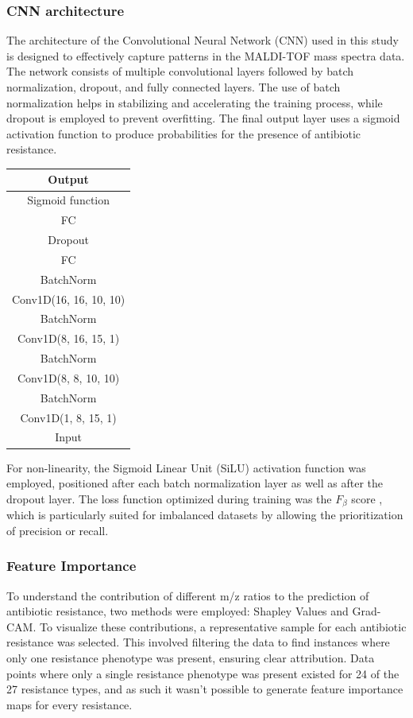 \documentclass[english,11pt,a4paper,titlepage]{article}
\begin{document}
	\subsubsection*{CNN architecture}
	\begin{multicols}{2}
		\noindent
		The architecture of the Convolutional Neural Network (CNN) used in this study is designed to effectively capture patterns in the MALDI-TOF mass spectra data. The network consists of multiple convolutional layers followed by batch normalization, dropout, and fully connected layers. The use of batch normalization helps in stabilizing and accelerating the training process, while dropout is employed to prevent overfitting. The final output layer uses a sigmoid activation function to produce probabilities for the presence of antibiotic resistance.
		
		\columnbreak
		
		\begin{tabular}{|c|}
			\hline
			Output \\
			\hline
			Sigmoid function \\
			\hline
			FC \\
			\hline
			Dropout \\
			\hline
			FC \\
			\hline
			BatchNorm \\
			\hline
			Conv1D(16, 16, 10, 10) \\
			\hline
			BatchNorm \\
			\hline
			Conv1D(8, 16, 15, 1) \\
			\hline
			BatchNorm \\
			\hline
			Conv1D(8, 8, 10, 10) \\
			\hline
			BatchNorm \\
			\hline
			Conv1D(1, 8, 15, 1) \\
			\hline
			Input \\
			\hline
		\end{tabular}
		
	\end{multicols}
	For non-linearity, the Sigmoid Linear Unit (SiLU) activation function was employed, positioned after each batch normalization layer as well as after the dropout layer. The loss function optimized during training was the \( F_{\beta} \) score \cite{leeSurrogateLossFunction2021}, which is particularly suited for imbalanced datasets by allowing the prioritization of precision or recall.
	
	\subsubsection*{Feature Importance}
	To understand the contribution of different m/z ratios to the prediction of antibiotic resistance, two methods were employed: Shapley Values and Grad-CAM. To visualize these contributions, a representative sample for each antibiotic resistance was selected. This involved filtering the data to find instances where only one resistance phenotype was present, ensuring clear attribution. Data points where only a single resistance phenotype was present existed for 24 of the 27 resistance types, and as such it wasn't possible to generate feature importance maps for every resistance.
	
\end{document}
